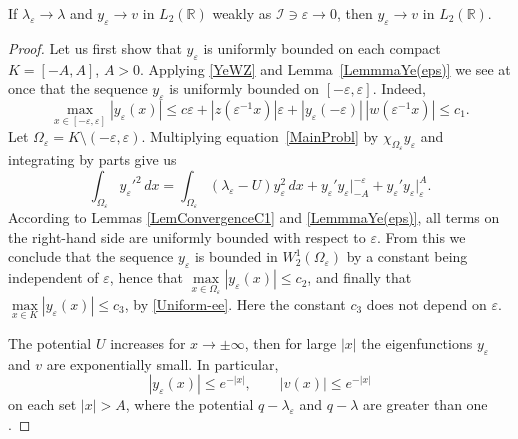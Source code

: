 \documentclass[11pt,english]{amsart}
\begin{document}
\begin{g_lemma}\label{LemmaL2convergence}
If $\lambda_\varepsilon\to\lambda$ and $y_\varepsilon\to v$ in $L_2(\mathbb{R})$ weakly as $\mathcal{I}\ni\varepsilon\to0$, then $y_\varepsilon\to v$ in $L_2(\mathbb{R})$.
\end{g_lemma}
\begin{proof}
Let us first show that $y_\varepsilon$ is uniformly bounded on each compact $K=[-A,A]$, $A>0$.
Applying \eqref{YeWZ} and Lemma~\ref{LemmmaYe(eps)} we see at once that the sequence $y_\varepsilon$
is uniformly bounded on $[-\varepsilon,\varepsilon]$.
Indeed,
\begin{equation}\label{Uniform-ee}
\max\limits_{x\in[-\varepsilon,\varepsilon]}|y_\varepsilon(x)|\leq c\varepsilon+|z(\varepsilon^{-1}x)|\varepsilon+|y_\varepsilon(-\varepsilon)|\,|w(\varepsilon^{-1}x)|\leq c_1.
\end{equation}
Let $\Omega_\varepsilon=K\setminus (-\varepsilon,\varepsilon)$.
Multiplying equation~\eqref{MainProbl} by $\chi_{\Omega_\varepsilon}y_\varepsilon$ and integrating
by parts give us
\begin{equation*}
   \int_{\Omega_\varepsilon}y_\varepsilon'^{2}\,dx=
\int_{\Omega_\varepsilon}(\lambda_\varepsilon-U)y_\varepsilon^2\,dx+y_\varepsilon'y_\varepsilon\Big|_{-A}^{-\varepsilon}+y_\varepsilon'y_\varepsilon\Big|^{A}_{\varepsilon}.
\end{equation*}
According to Lemmas \ref{LemConvergenceC1} and \ref{LemmmaYe(eps)}, all terms on the right-hand side are uniformly bounded with respect to $\varepsilon$.
From this we conclude that the sequence $y_\varepsilon$ is bounded in $W^1_2(\Omega_\varepsilon)$ by a constant being independent of $\varepsilon$, hence that  $\max\limits_{x\in\Omega_\varepsilon} |y_\varepsilon(x)|\leq c_2$, and finally that $\max\limits_{x\in K}|y_\varepsilon(x)|\leq c_3$, by
\eqref{Uniform-ee}.
Here the constant $c_3$ does not depend on $\varepsilon$.

The potential $U$ increases for $x\to\pm\infty$, then for large ${\left\vert{x}\right\vert}$ the eigenfunctions $y_\varepsilon$ and $v$ are exponentially small.
In particular,
$$
    |y_\varepsilon(x)|\leq e^{-|x|},\qquad|v(x)|\leq e^{-|x|}
$$
on each set $|x|>A$, where the potential $q-\lambda_\varepsilon$ and $q-\lambda$ are greater than one \cite[p.~59]{BS}.


\end{proof}
\end{document}
